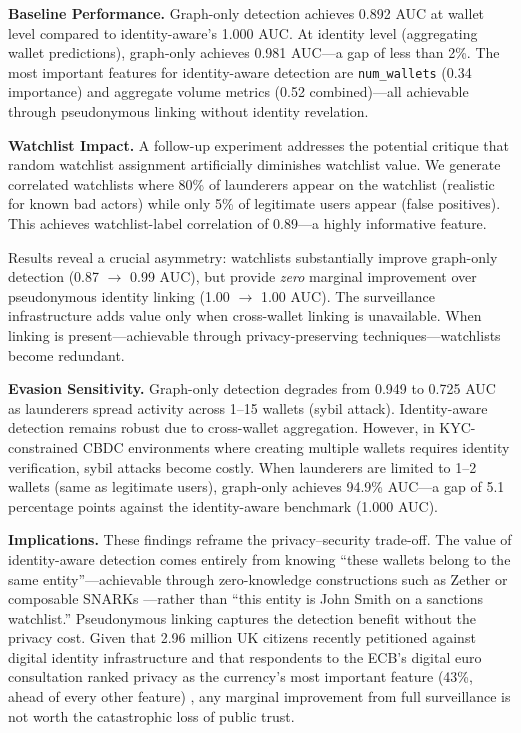 \documentclass[11pt]{article}
\begin{document}
\textbf{Baseline Performance.} Graph-only detection achieves 0.892 AUC at wallet level compared to identity-aware's 1.000 AUC. At identity level (aggregating wallet predictions), graph-only achieves 0.981 AUC---a gap of less than 2\%. The most important features for identity-aware detection are \texttt{num\_wallets} (0.34 importance) and aggregate volume metrics (0.52 combined)---all achievable through pseudonymous linking without identity revelation.

\textbf{Watchlist Impact.} A follow-up experiment addresses the potential critique that random watchlist assignment artificially diminishes watchlist value. We generate correlated watchlists where 80\% of launderers appear on the watchlist (realistic for known bad actors) while only 5\% of legitimate users appear (false positives). This achieves watchlist-label correlation of 0.89---a highly informative feature.

Results reveal a crucial asymmetry: watchlists substantially improve graph-only detection (0.87 $\rightarrow$ 0.99 AUC), but provide \textit{zero} marginal improvement over pseudonymous identity linking (1.00 $\rightarrow$ 1.00 AUC). The surveillance infrastructure adds value only when cross-wallet linking is unavailable. When linking is present---achievable through privacy-preserving techniques---watchlists become redundant.

\textbf{Evasion Sensitivity.} Graph-only detection degrades from 0.949 to 0.725 AUC as launderers spread activity across 1--15 wallets (sybil attack). Identity-aware detection remains robust due to cross-wallet aggregation. However, in KYC-constrained CBDC environments where creating multiple wallets requires identity verification, sybil attacks become costly. When launderers are limited to 1--2 wallets (same as legitimate users), graph-only achieves 94.9\% AUC---a gap of 5.1 percentage points against the identity-aware benchmark (1.000 AUC).

\textbf{Implications.} These findings reframe the privacy--security trade-off. The value of identity-aware detection comes entirely from knowing ``these wallets belong to the same entity''---achievable through zero-knowledge constructions such as Zether \citep{Bunz2020} or composable SNARKs \citep{Campanelli2019}---rather than ``this entity is John Smith on a sanctions watchlist.'' Pseudonymous linking captures the detection benefit without the privacy cost. Given that 2.96 million UK citizens recently petitioned against digital identity infrastructure \citep{Statewatch2025} and that respondents to the ECB's digital euro consultation ranked privacy as the currency's most important feature (43\%, ahead of every other feature) \citep{ECBConsultation2021}, any marginal improvement from full surveillance is not worth the catastrophic loss of public trust.
\end{document}
